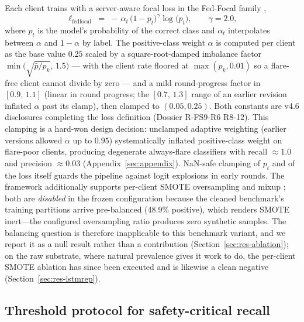 Each client trains with a server-aware focal loss in the Fed-Focal
family \cite{sarkar2020},
\begin{equation}\label{eq:focal}
    \ell_{\mathrm{fedfocal}}
    \;=\; -\,\alpha_t\,\bigl(1 - p_t\bigr)^{\gamma}
    \log\bigl(p_t\bigr),
    \qquad \gamma = 2.0,
\end{equation}
where $p_t$ is the model's probability of the correct class and
$\alpha_t$ interpolates between $\alpha$ and $1-\alpha$ by label. The
positive-class weight $\alpha$ is computed per client as the base value
$0.25$ \cite{lin2017} scaled by a square-root-damped imbalance factor
$\min\!\big(\sqrt{\bar{p}/p_k},\,1.5\big)$ --- with the client rate
floored at $\max(p_k, 0.01)$ so a flare-free client cannot divide by
zero --- and a mild round-progress factor in $[0.9,\,1.1]$
(linear in round progress; the $[0.7,\,1.3]$ range of an earlier
revision inflated $\alpha$ past its clamp), then clamped to
$(0.05, 0.25)$. Both constants are v4.6 disclosures completing the
loss definition (Dossier R-FS9-R6 R8-12). This clamping is a hard-won
design decision: unclamped adaptive weighting (earlier versions allowed
$\alpha$ up to $0.95$) systematically inflated positive-class weight on
flare-poor clients, producing degenerate always-flare classifiers with
recall $\approx 1.0$ and precision $\approx 0.03$
(Appendix~\ref{sec:appendix}). NaN-safe clamping of $p_t$ and of the
loss itself guards the pipeline against logit explosions in early
rounds. The framework additionally supports per-client SMOTE
oversampling \cite{chawla2002} and mixup \cite{zhang2018}; both are
\emph{disabled} in the frozen configuration because the cleaned
benchmark's training partitions arrive pre-balanced (48.9\% positive),
which renders SMOTE inert---the configured oversampling ratio produces
zero synthetic samples. The balancing question is therefore
inapplicable to this benchmark variant, and we report it as a null
result rather than a contribution (Section~\ref{sec:res-ablation});
on the raw substrate, where natural prevalence gives it work to do,
the per-client SMOTE ablation has since been executed and is
likewise a clean negative (Section~\ref{sec:res-lstmrep}).

\subsection{Threshold protocol for safety-critical recall}
\label{sec:thresholding}

